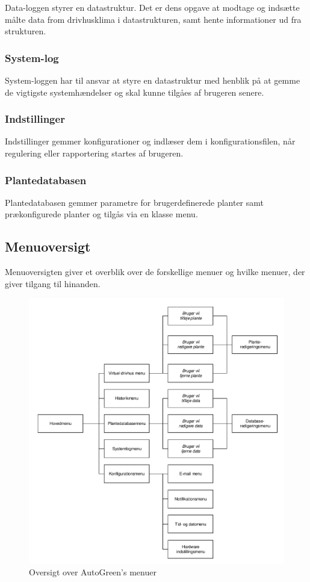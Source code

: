 Data-loggen styrer en datastruktur. Det er dens opgave at modtage og indsætte målte data from drivhusklima i datastrukturen, samt hente informationer ud fra strukturen.

\subsubsection{System-log}

System-loggen har til ansvar at styre en datastruktur med henblik på at gemme de vigtigste systemhændelser og skal kunne tilgåes af brugeren senere.

\subsubsection{Indstillinger}

Indstillinger gemmer konfigurationer og indlæser dem i konfigurationsfilen, når regulering eller rapportering startes af brugeren. 

\subsubsection{Plantedatabasen}

Plantedatabasen gemmer parametre for brugerdefinerede planter samt  prækonfigurede planter og tilgås via en klasse menu.

\clearpage

\subsection{Menuoversigt}

Menuoversigten giver et overblik over de forskellige menuer og hvilke menuer, der giver tilgang til hinanden.

\begin{figure}[!h]
\centering 
\includegraphics[scale=0.7] {../fig/menu_oversigt.pdf}
\caption{Oversigt over AutoGreen's menuer}
\label{fig:QTMenu}
\end{figure}


